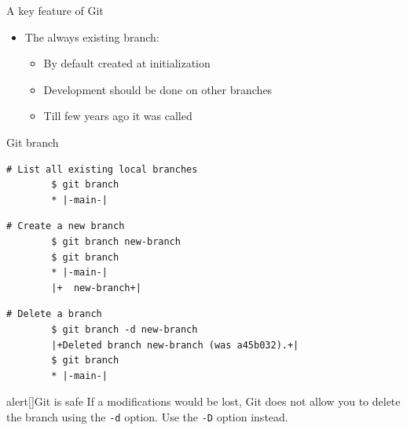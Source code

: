 \documentclass[usenames,svgnames,14pt]{beamer}
\begin{document}
\begin{frame}{A key feature of Git}
\begin{overlayarea}{\textwidth}{0.7\textheight}
\begin{itemize}
\begin{itemize}
                      \item {}[\ldots]
                  \end{itemize}
            \item<2-> The always existing \;\; branch:
                  \begin{itemize}
                      \item By default created at initialization
                      \item Development should be done on other branches
                      \item Till few years ago it was called \;
                  \end{itemize}
        \end{itemize}
    \end{overlayarea}
\end{frame}
\begin{frame}[fragile]{Git branch}
    \begin{lstlisting}[style=MyBash]
        # List all existing local branches
        $ git branch
        * |-main-|
    \end{lstlisting}
    \begin{lstlisting}[style=MyBash]
        # Create a new branch
        $ git branch new-branch
        $ git branch
        * |-main-|
        |+  new-branch+|
    \end{lstlisting}
    \begin{lstlisting}[style=MyBash]
        # Delete a branch
        $ git branch -d new-branch
        |+Deleted branch new-branch (was a45b032).+|
        $ git branch
        * |-main-|
    \end{lstlisting}
    \begin{varblock}{alert}[\textwidth]{Git is safe}
        \small
        If a modifications would be lost, Git does not allow you to delete the branch using the \texttt{-d} option.
        Use the \texttt{-D} option instead.
    \end{varblock}
\end{frame}
\end{document}

